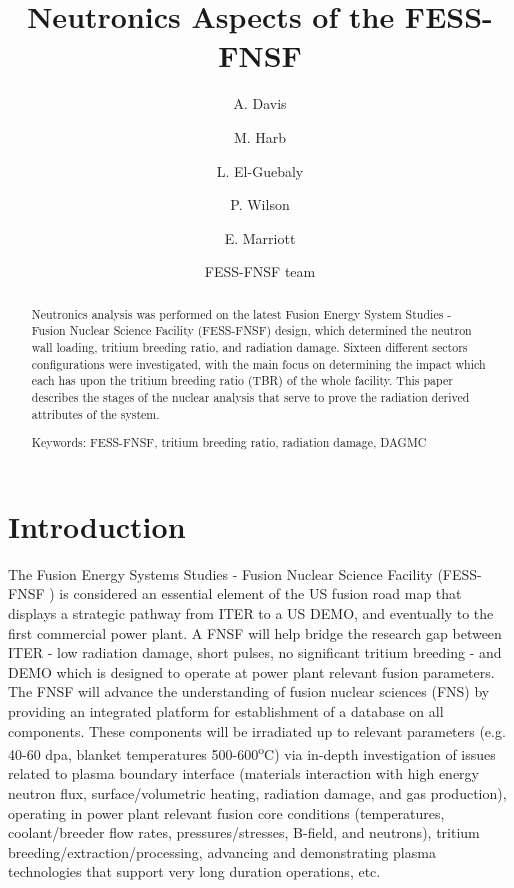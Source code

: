 \documentclass[12pt, letterpaper]{elsarticle}
\title{Neutronics Aspects of the FESS-FNSF}
\author[wisc]{A. Davis\corref{cor1}}
\author[wisc]{M. Harb}
\author[wisc]{L. El-Guebaly}
\author[wisc]{P. Wilson}
\author[wisc]{E. Marriott}
\author{FESS-FNSF team}
\begin{document}
 
\begin{abstract}
Neutronics analysis was performed on the latest Fusion Energy System Studies - Fusion Nuclear Science Facility (FESS-FNSF) design, which determined the neutron wall loading, tritium breeding ratio, and radiation damage. Sixteen different sectors configurations were investigated, with the main focus on determining the impact which each has upon the tritium breeding ratio (TBR) of the whole facility. This paper describes the stages of the nuclear analysis that serve to prove the radiation derived attributes of the system.

\vspace{5mm}
\noindent
Keywords: FESS-FNSF, tritium breeding ratio, radiation damage, DAGMC
\end{abstract}

\begin{titlepage}
\maketitle
\end{titlepage}

\newpage
\listoffigures

\newpage
\section{Introduction} \label{Introduction}
The Fusion Energy Systems Studies - Fusion Nuclear Science Facility (FESS-FNSF \cite{ref_1}) is considered an essential element of the US fusion road map that displays a strategic pathway from ITER to a US DEMO, and eventually to the first commercial power plant. A FNSF will help bridge the research gap between ITER - low radiation damage, short pulses, no significant tritium breeding - and DEMO which is designed to operate at power plant relevant fusion parameters. The FNSF will advance the understanding of fusion nuclear sciences (FNS) by providing an integrated platform for establishment of a database on all components. These components will be irradiated up to relevant parameters (e.g. 40-60 dpa, blanket temperatures 500-600\textsuperscript{o}C) via in-depth investigation of issues related to plasma boundary interface (materials interaction with high energy neutron flux, surface/volumetric heating, radiation damage, and gas production), operating in power plant relevant fusion core conditions (temperatures, coolant/breeder flow rates, pressures/stresses, B-field, and neutrons), tritium breeding/extraction/processing, advancing and demonstrating plasma technologies that support very long duration operations, etc.\vspace{5mm}
\end{document}
